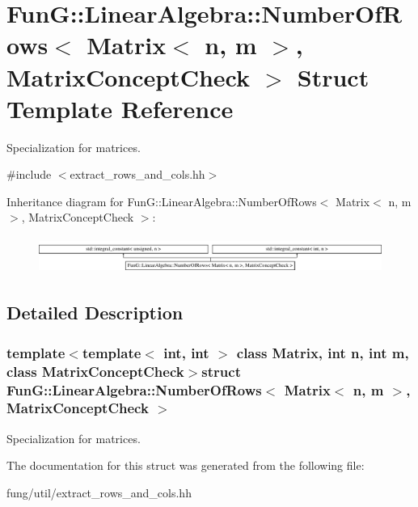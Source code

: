 \hypertarget{structFunG_1_1LinearAlgebra_1_1NumberOfRows_3_01Matrix_3_01n_00_01m_01_4_00_01MatrixConceptCheck_01_4}{\section{Fun\-G\-:\-:Linear\-Algebra\-:\-:Number\-Of\-Rows$<$ Matrix$<$ n, m $>$, Matrix\-Concept\-Check $>$ Struct Template Reference}
\label{structFunG_1_1LinearAlgebra_1_1NumberOfRows_3_01Matrix_3_01n_00_01m_01_4_00_01MatrixConceptCheck_01_4}
}


Specialization for matrices.  




{\ttfamily \#include $<$extract\-\_\-rows\-\_\-and\-\_\-cols.\-hh$>$}

Inheritance diagram for Fun\-G\-:\-:Linear\-Algebra\-:\-:Number\-Of\-Rows$<$ Matrix$<$ n, m $>$, Matrix\-Concept\-Check $>$\-:\begin{figure}[H]
\begin{center}
\leavevmode
\includegraphics[height=1.199143cm]{structFunG_1_1LinearAlgebra_1_1NumberOfRows_3_01Matrix_3_01n_00_01m_01_4_00_01MatrixConceptCheck_01_4}
\end{center}
\end{figure}


\subsection{Detailed Description}
\subsubsection*{template$<$template$<$ int, int $>$ class Matrix, int n, int m, class Matrix\-Concept\-Check$>$struct Fun\-G\-::\-Linear\-Algebra\-::\-Number\-Of\-Rows$<$ Matrix$<$ n, m $>$, Matrix\-Concept\-Check $>$}

Specialization for matrices. 

The documentation for this struct was generated from the following file\-:\begin{DoxyCompactItemize}
\item 
fung/util/extract\-\_\-rows\-\_\-and\-\_\-cols.\-hh\end{DoxyCompactItemize}
